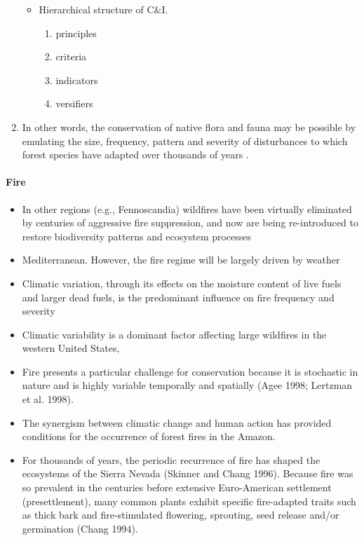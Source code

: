 \documentclass{article}
\begin{document}
\begin{enumerate}
\begin{itemize}
        \item Hierarchical structure of C&I. \cite{mendoza2000development}
            \begin{enumerate}
                \item principles
                \item criteria
                \item indicators
                \item versifiers
            \end{enumerate}
    \end{itemize}
    \item In other words, the conservation of native flora and fauna may be possible by emulating the size, frequency, pattern and severity of disturbances to which forest species have adapted over thousands of years \cite{hunter1990wildlife} \cite{hunter1988paleoecology}.
\end{enumerate}



\paragraph{Fire}

\begin{itemize}
   \item In other regions (e.g., Fennoscandia) wildfires have been virtually eliminated by centuries of aggressive fire suppression, and now are being re-introduced to restore biodiversity patterns and ecosystem processes \cite{wallenius2011major}
   \item Mediterranean. However, the fire regime will be largely driven by weather \cite{fernandes_fire-smart_2013}
   \item Climatic variation, through its effects on the moisture content of live fuels and larger dead fuels, is the predominant influence on fire frequency and severity \cite{schoennagel_interaction_2004}
   \item Climatic variability is a dominant factor affecting large wildfires in the western United States,\cite{mckenzie_climatic_2004}
   \item Fire presents a particular challenge for conservation because it is stochastic in nature and is highly variable temporally and spatially (Agee 1998; Lertzman et al. 1998). \cite{agee1998landscape} \cite{lertzman1998three}
    \item The synergism between climatic change and human action has provided conditions for the occurrence of forest fires in the Amazon. \cite{da2018dynamics}
    \item For thousands of years, the periodic recurrence of fire has shaped the ecosystems of the Sierra Nevada (Skinner and Chang 1996). Because fire was so prevalent in the centuries before extensive Euro-American settlement (presettlement), many common plants exhibit specific fire-adapted traits such as thick bark and fire-stimulated flowering, sprouting, seed release and/or germination (Chang 1994). \cite{mckelvey1996overview} \cite{chang1996ecosystem}
\end{itemize}
\end{document}
